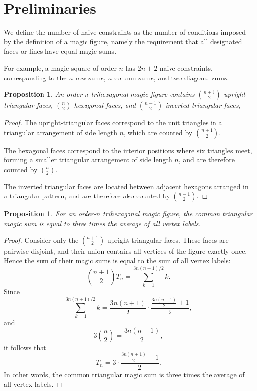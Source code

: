 \documentclass[11pt]{article}
\theoremstyle{plain}
\newtheorem{proposition}[theorem]{Proposition}
\theoremstyle{definition}
\begin{document}
\section{Preliminaries}

We define the number of naive constraints as the number of conditions imposed by the definition of a magic figure, namely the requirement that all designated faces or lines have equal magic sums.

For example, a magic square of order $n$ has $2n+2$ naive constraints, corresponding to the $n$ row sums, $n$ column sums, and two diagonal sums.

\begin{proposition}\label{prop:constraints}
An order-$n$ trihexagonal magic figure contains $\binom{n+1}{2}$ upright-triangular faces, $\binom{n}{2}$ hexagonal faces, and $\binom{n-1}{2}$ inverted triangular faces,
\end{proposition}

\begin{proof}
The upright-triangular faces correspond to the unit triangles in a triangular arrangement of side length $n$, which are counted by $\binom{n+1}{2}$. 

The hexagonal faces correspond to the interior positions where six triangles meet, forming a smaller triangular arrangement of side length $n$, and are therefore counted by $\binom{n}{2}$.

The inverted triangular faces are located between adjacent hexagons arranged in a triangular pattern, and are therefore also counted by $\binom{n-1}{2}$.
\end{proof}

\begin{proposition}
For an order-$n$ trihexagonal magic figure, the common triangular magic sum is equal to three times the average of all vertex labels.
\end{proposition}

\begin{proof}
Consider only the $\binom{n+1}{2}$ upright triangular faces. These faces are pairwise disjoint, and their union contains all vertices of the figure exactly once. Hence the sum of their magic sums is equal to the sum of all vertex labels:
\[
\binom{n+1}{2} T_n = \sum_{k=1}^{3n(n+1)/2} k.
\]
Since
\[
\sum_{k=1}^{3n(n+1)/2} k
=
\frac{3n(n+1)}{2}\cdot \frac{\frac{3n(n+1)}{2}+1}{2},
\]
and
\[
3\binom{n}{2}=\frac{3n(n+1)}{2},
\]
it follows that
\[
T_n
=
3\cdot \frac{\frac{3n(n+1)}{2}+1}{2}.
\]
In other words, the common triangular magic sum is three times the average of all vertex labels.
\end{proof}
\end{document}
